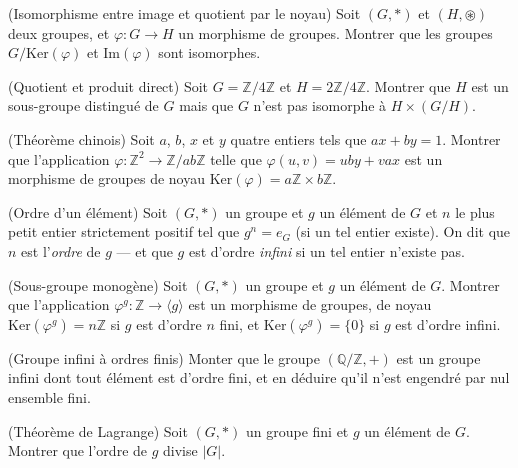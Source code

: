 \begin{exo}(Isomorphisme entre image et quotient par le noyau)
Soit $(G, \ast)$ et $(H, \circledast)$ deux groupes,
et $\varphi : G \to H$ un morphisme de groupes.
Montrer que les groupes
$G / \mathrm{Ker}(\varphi)$ et $\mathrm{Im}(\varphi)$ sont isomorphes.
\end{exo}

\begin{exo}(Quotient et produit direct)
Soit $G = \mathbb{Z}/4\mathbb{Z}$ et $H = 2\mathbb{Z}/4\mathbb{Z}$.
Montrer que $H$ est un sous-groupe distingué de $G$ mais que
$G$ n'est pas isomorphe à $H \times (G / H)$.
\end{exo}

\begin{exo}(Théorème chinois)
Soit $a$, $b$, $x$ et $y$ quatre entiers tels que $a x + b y = 1$.
Montrer que l'application $\varphi : \mathbb{Z}^2 \to \mathbb{Z}/ab \mathbb{Z}$
telle que $\varphi(u, v) = u b y + v a x$ est un morphisme de groupes de noyau
$\mathrm{Ker}(\varphi) = a \mathbb{Z} \times b \mathbb{Z}$.
\end{exo}

\begin{defn}(Ordre d'un élément)
Soit $(G, \ast)$ un groupe et $g$ un élément de $G$ et
$n$ le plus petit entier strictement positif tel que $g^n = e_G$
(si un tel entier existe).
On dit que $n$ est l'\emph{ordre} de $g$ ---
et que $g$ est d'ordre \emph{infini} si un tel entier n'existe pas.
\end{defn}

\begin{exo}(Sous-groupe monogène)
Soit $(G, \ast)$ un groupe et $g$ un élément de $G$.
Montrer que l'application $\varphi^g : \mathbb{Z} \to \langle g \rangle$ est un morphisme de groupes,
de noyau $\mathrm{Ker}(\varphi^g) = n \mathbb{Z}$ si $g$ est d'ordre $n$ fini, et
$\mathrm{Ker}(\varphi^g) = \{0\}$ si $g$ est d'ordre infini.
\end{exo}

\begin{exo}(Groupe infini à ordres finis)
Monter que le groupe $(\mathbb{Q}/\mathbb{Z}, +)$ est un groupe infini
dont tout élément est d'ordre fini,
et en déduire qu'il n'est engendré par nul ensemble fini.
\end{exo}

\begin{exo}(Théorème de Lagrange)
Soit $(G, \ast)$ un groupe fini et $g$ un élément de $G$.
Montrer que l'ordre de $g$ divise $\vert G \vert$.
\end{exo}

